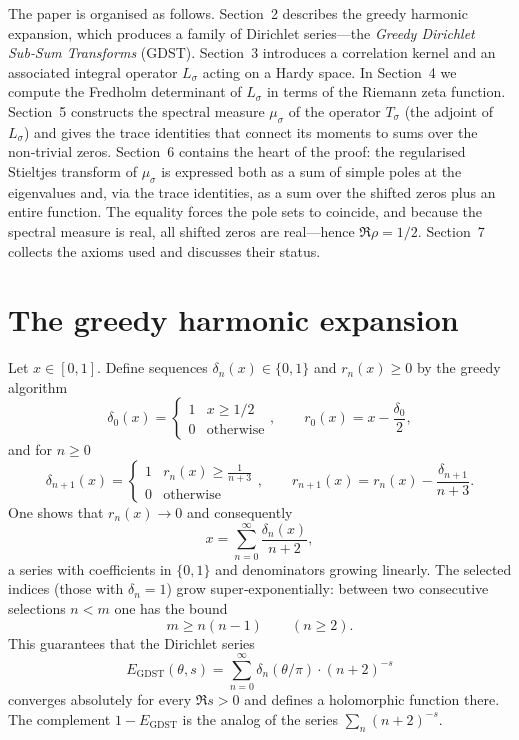 \documentclass[11pt,a4paper]{article}
\theoremstyle{definition}
\newcommand{\GDST}{\mathrm{GDST}}
\begin{document}
The paper is organised as follows.
Section~2 describes the greedy harmonic expansion, which produces a family of Dirichlet series—the \emph{Greedy Dirichlet Sub‑Sum Transforms} (GDST).
Section~3 introduces a correlation kernel and an associated integral operator \(L_\sigma\) acting on a Hardy space.
In Section~4 we compute the Fredholm determinant of \(L_\sigma\) in terms of the Riemann zeta function.
Section~5 constructs the spectral measure \(\mu_\sigma\) of the operator \(T_\sigma\) (the adjoint of \(L_\sigma\)) and gives the trace identities that connect its moments to sums over the non‑trivial zeros.
Section~6 contains the heart of the proof: the regularised Stieltjes transform of \(\mu_\sigma\) is expressed both as a sum of simple poles at the eigenvalues and, via the trace identities, as a sum over the shifted zeros plus an entire function.
The equality forces the pole sets to coincide, and because the spectral measure is real, all shifted zeros are real—hence \(\Re \rho = 1/2\).
Section~7 collects the axioms used and discusses their status.

\section{The greedy harmonic expansion}
Let \(x \in [0,1]\).
Define sequences \(\delta_n(x) \in \{0,1\}\) and \(r_n(x) \ge 0\) by the greedy algorithm
\[
\delta_0(x) = \begin{cases}1 & x \ge 1/2 \\ 0 & \text{otherwise}\end{cases},\qquad
r_0(x) = x - \frac{\delta_0}{2},
\]
and for \(n \ge 0\)
\[
\delta_{n+1}(x) = \begin{cases}
1 & r_n(x) \ge \frac{1}{n+3} \\[2mm]
0 & \text{otherwise}
\end{cases}, \qquad
r_{n+1}(x) = r_n(x) - \frac{\delta_{n+1}}{n+3}.
\]
One shows that \(r_n(x) \to 0\) and consequently
\begin{equation}\label{greedy}
x = \sum_{n=0}^\infty \frac{\delta_n(x)}{n+2},
\end{equation}
a series with coefficients in \(\{0,1\}\) and denominators growing linearly.
The selected indices (those with \(\delta_n=1\)) grow super‑exponentially: between two consecutive selections \(n < m\) one has the bound
\[
m \ge n(n-1) \qquad (n \ge 2).
\]
This guarantees that the Dirichlet series
\[
E_{\GDST}(\theta,s) = \sum_{n=0}^\infty \delta_n(\theta/\pi) \cdot (n+2)^{-s}
\]
converges absolutely for every \(\Re s > 0\) and defines a holomorphic function there.
The complement \(1 - E_{\GDST}\) is the analog of the series \(\sum_{n} (n+2)^{-s}\).
\end{document}
